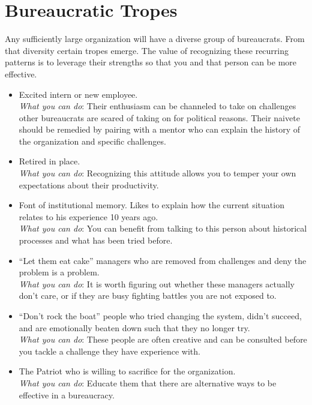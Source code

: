 \section{Bureaucratic Tropes\label{sec:tropes}}

Any sufficiently large organization will have a diverse group of bureaucrats. From that diversity certain tropes emerge. The value of recognizing these recurring patterns is to leverage their strengths so that you and that person can be more effective. 

\begin{itemize}
    \item Excited intern or new employee. \\
    \textit{What you can do}: Their enthusiasm can be channeled to take on challenges other bureaucrats are scared of taking on for political reasons. Their naivete should be remedied by pairing with a mentor who can explain the history of the organization and specific challenges.
    
    \item Retired in place. \\
    \textit{What you can do}: Recognizing this attitude allows you to temper your own expectations about their productivity. 
    
    \item Font of institutional memory. Likes to explain how the current situation relates to his experience 10 years ago. \\
    \textit{What you can do}: You can benefit from talking to this person about historical processes and what has been tried before. 
    
    \item ``Let them eat cake'' managers who are removed from challenges and deny the problem is a problem. \\
    \textit{What you can do}: It is worth figuring out whether these managers actually don't care, or if they are busy fighting battles you are not exposed to.
    
    \item ``Don't rock the boat'' people who tried changing the system, didn't succeed, and are emotionally beaten down such that they no longer try. \\
    \textit{What you can do}: These people are often creative and can be consulted before you tackle a challenge they have experience with. 
    
    \item The Patriot who is willing to sacrifice for the organization. \\
    \textit{What you can do}: Educate them that there are alternative ways to be effective in a bureaucracy.
    

\end{itemize}

